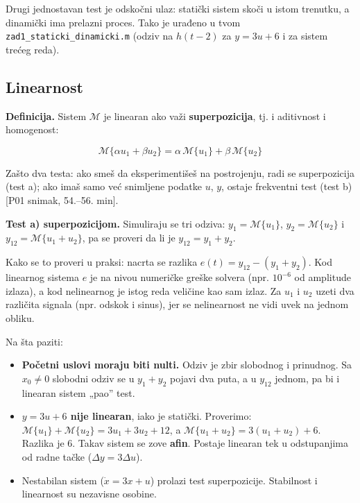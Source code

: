 \documentclass[11pt,a4paper,parskip=half,headsepline,numbers=noenddot]{scrartcl}
\DeclareRobustCommand{\izvor}[1]{{\small\color{izvorC}[#1]}}
\begin{document}
Drugi jednostavan test je odskočni ulaz: statički sistem skoči u istom trenutku, a dinamički ima prelazni proces. Tako je urađeno u tvom \texttt{zad1\_\allowbreak{}staticki\_\allowbreak{}dinamicki.m} (odziv na \(h(t-2)\) za \(y = 3u+6\) i za sistem trećeg reda).

\subsection{Linearnost}

\textbf{Definicija.} Sistem \(\mathcal M\) je linearan ako važi \textbf{superpozicija}, tj. i aditivnost i homogenost:

\[\mathcal M\{\alpha u_1 + \beta u_2\} = \alpha\,\mathcal M\{u_1\} + \beta\,\mathcal M\{u_2\}\]

Zašto dva testa: ako smeš da eksperimentišeš na postrojenju, radi se superpozicija (test a); ako imaš samo već snimljene podatke \(u\), \(y\), ostaje frekventni test (test b) \izvor{P01 snimak, 54.--56. min}.

\textbf{Test a) superpozicijom.} Simuliraju se tri odziva: \(y_1 = \mathcal M\{u_1\}\), \(y_2 = \mathcal M\{u_2\}\) i \(y_{12} = \mathcal M\{u_1 + u_2\}\), pa se proveri da li je \(y_{12} = y_1 + y_2\).

Kako se to proveri u praksi: nacrta se razlika \(e(t) = y_{12} - (y_1 + y_2)\). Kod linearnog sistema \(e\) je na nivou numeričke greške solvera (npr. \(10^{-6}\) od amplitude izlaza), a kod nelinearnog je istog reda veličine kao sam izlaz. Za \(u_1\) i \(u_2\) uzeti dva različita signala (npr. odskok i sinus), jer se nelinearnost ne vidi uvek na jednom obliku.

Na šta paziti:

\begin{itemize}
\item \textbf{Početni uslovi moraju biti nulti.} Odziv je zbir slobodnog i prinudnog. Sa \(x_0 \ne 0\) slobodni odziv se u \(y_1 + y_2\) pojavi dva puta, a u \(y_{12}\) jednom, pa bi i linearan sistem „pao'' test.
\item \textbf{\(y = 3u + 6\) nije linearan}, iako je statički. Proverimo: \(\mathcal M\{u_1\} + \mathcal M\{u_2\} = 3u_1 + 3u_2 + 12\), a \(\mathcal M\{u_1 + u_2\} = 3(u_1 + u_2) + 6\). Razlika je 6. Takav sistem se zove \textbf{afin}. Postaje linearan tek u odstupanjima od radne tačke (\(\Delta y = 3\Delta u\)).
\item Nestabilan sistem (\(\dot x = 3x + u\)) prolazi test superpozicije. Stabilnost i linearnost su nezavisne osobine.
\end{itemize}
\end{document}
